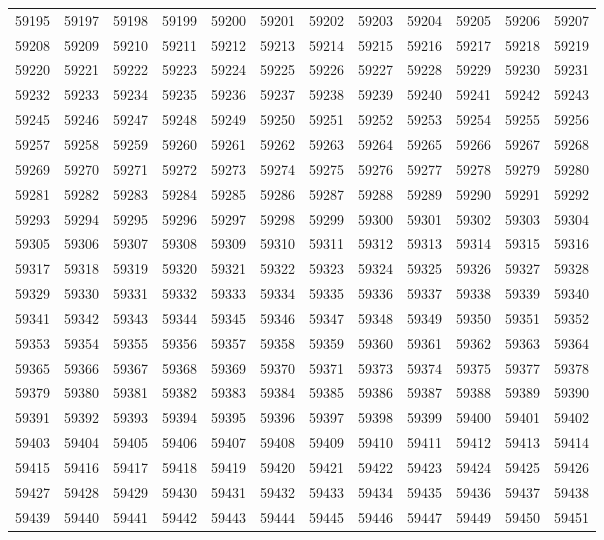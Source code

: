\begin{center}
\begin{longtable}{llllllllllll}
59195 &59197 &59198 &59199 &59200 &59201 &59202 &59203 &59204 &59205 &59206 &59207 \\
59208 &59209 &59210 &59211 &59212 &59213 &59214 &59215 &59216 &59217 &59218 &59219 \\
59220 &59221 &59222 &59223 &59224 &59225 &59226 &59227 &59228 &59229 &59230 &59231 \\
59232 &59233 &59234 &59235 &59236 &59237 &59238 &59239 &59240 &59241 &59242 &59243 \\
59245 &59246 &59247 &59248 &59249 &59250 &59251 &59252 &59253 &59254 &59255 &59256 \\
59257 &59258 &59259 &59260 &59261 &59262 &59263 &59264 &59265 &59266 &59267 &59268 \\
59269 &59270 &59271 &59272 &59273 &59274 &59275 &59276 &59277 &59278 &59279 &59280 \\
59281 &59282 &59283 &59284 &59285 &59286 &59287 &59288 &59289 &59290 &59291 &59292 \\
59293 &59294 &59295 &59296 &59297 &59298 &59299 &59300 &59301 &59302 &59303 &59304 \\
59305 &59306 &59307 &59308 &59309 &59310 &59311 &59312 &59313 &59314 &59315 &59316 \\
59317 &59318 &59319 &59320 &59321 &59322 &59323 &59324 &59325 &59326 &59327 &59328 \\
59329 &59330 &59331 &59332 &59333 &59334 &59335 &59336 &59337 &59338 &59339 &59340 \\
59341 &59342 &59343 &59344 &59345 &59346 &59347 &59348 &59349 &59350 &59351 &59352 \\
59353 &59354 &59355 &59356 &59357 &59358 &59359 &59360 &59361 &59362 &59363 &59364 \\
59365 &59366 &59367 &59368 &59369 &59370 &59371 &59373 &59374 &59375 &59377 &59378 \\
59379 &59380 &59381 &59382 &59383 &59384 &59385 &59386 &59387 &59388 &59389 &59390 \\
59391 &59392 &59393 &59394 &59395 &59396 &59397 &59398 &59399 &59400 &59401 &59402 \\
59403 &59404 &59405 &59406 &59407 &59408 &59409 &59410 &59411 &59412 &59413 &59414 \\
59415 &59416 &59417 &59418 &59419 &59420 &59421 &59422 &59423 &59424 &59425 &59426 \\
59427 &59428 &59429 &59430 &59431 &59432 &59433 &59434 &59435 &59436 &59437 &59438 \\
59439 &59440 &59441 &59442 &59443 &59444 &59445 &59446 &59447 &59449 &59450 &59451 \\

\end{longtable}
\end{center}
